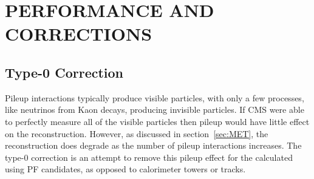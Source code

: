 %
%
%
%



\chapter{\texorpdfstring{\uppercase{\VETslash Performance and Corrections}}{MET Performance and Corrections}}
\label{appendix:MET}


\section{Type-0 \texorpdfstring{\VETslash}{MET} Correction}
\label{appendix:type_zero_met}
Pileup interactions typically produce visible particles, with only a few processes, like neutrinos from Kaon decays, producing invisible particles.
If CMS were able to perfectly measure all of the visible particles then pileup would have little effect on the \VETslash reconstruction.
However, as discussed in section~\ref{sec:MET}, the \VETslash reconstruction does degrade as the number of pileup interactions increases.
The type-0 correction is an attempt to remove this pileup effect for the \VETslash calculated using PF candidates, as opposed to calorimeter towers or tracks.

